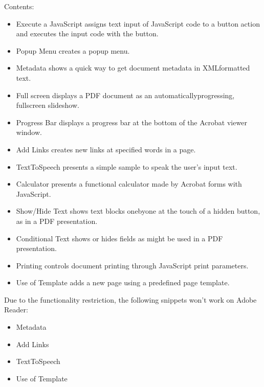 \documentclass[letterpaper,12pt,english,openany,oneside]{sphinxmanual}
\begin{document}
Contents:
\begin{itemize}
\item {} 
Execute a JavaScript \sphinxhyphen{} assigns text input of JavaScript code to a button action and executes the input code with the button.

\item {} 
Popup Menu \sphinxhyphen{} creates a popup menu.

\item {} 
Metadata \sphinxhyphen{} shows a quick way to get document metadata in XML\sphinxhyphen{}formatted text.

\item {} 
Full screen \sphinxhyphen{} displays a PDF document as an automatically\sphinxhyphen{}progressing, full\sphinxhyphen{}screen slideshow.

\item {} 
Progress Bar \sphinxhyphen{} displays a progress bar at the bottom of the Acrobat viewer window.

\item {} 
Add Links \sphinxhyphen{} creates new links at specified words in a page.

\item {} 
Text\sphinxhyphen{}To\sphinxhyphen{}Speech \sphinxhyphen{} presents a simple sample to speak the user’s input text.

\item {} 
Calculator \sphinxhyphen{} presents a functional calculator made by Acrobat forms with JavaScript.

\item {} 
Show/Hide Text \sphinxhyphen{} shows text blocks one\sphinxhyphen{}by\sphinxhyphen{}one at the touch of a hidden button, as in a PDF presentation.

\item {} 
Conditional Text \sphinxhyphen{} shows or hides fields as might be used in a PDF presentation.

\item {} 
Printing \sphinxhyphen{} controls document printing through JavaScript print parameters.

\item {} 
Use of Template \sphinxhyphen{} adds a new page using a predefined page template.

\end{itemize}

Due to the functionality restriction, the following snippets won’t work on Adobe Reader:
\begin{itemize}
\item {} 
Metadata

\item {} 
Add Links

\item {} 
Text\sphinxhyphen{}To\sphinxhyphen{}Speech

\item {} 
Use of Template

\end{itemize}
\end{document}
